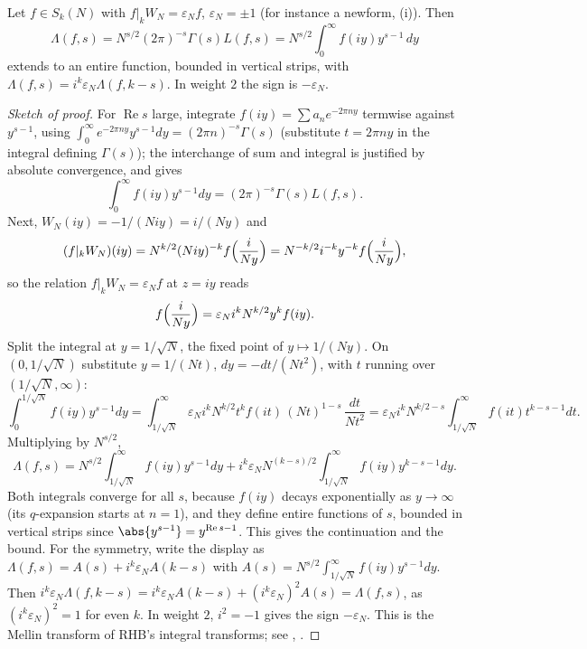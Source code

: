 \begin{theorem}\label{thm:hecke:functional-equation}
Let $f\in S_k(N)$ with $f|_kW_N=\varepsilon_Nf$, $\varepsilon_N=\pm1$ (for instance a newform, (i)). Then
\[
\Lambda(f,s)=N^{s/2}(2\pi)^{-s}\Gamma(s)L(f,s)=N^{s/2}\int_0^\infty f(iy)y^{s-1}\,dy
\]
extends to an entire function, bounded in vertical strips, with $\Lambda(f,s)=i^k\varepsilon_N\Lambda(f,k-s)$. In weight $2$ the sign is $-\varepsilon_N$.
\end{theorem}

\begin{proof}[Sketch of proof]
For $\operatorname{Re}s$ large, integrate $f(iy)=\sum a_ne^{-2\pi ny}$ termwise against $y^{s-1}$, using $\int_0^\infty e^{-2\pi ny}y^{s-1}dy=(2\pi n)^{-s}\Gamma(s)$ (substitute $t=2\pi ny$ in the
integral defining $\Gamma(s)$); the interchange of sum and integral is justified by absolute convergence, and gives
\[
\int_0^\infty f(iy)y^{s-1}dy=(2\pi)^{-s}\Gamma(s)L(f,s).
\]
Next, $W_N(iy)=-1/(Niy)=i/(Ny)$ and
\[
(f|_kW_N)(iy)=N^{k/2}(Niy)^{-k}f\Bigl(\frac i{Ny}\Bigr)=N^{-k/2}i^{-k}y^{-k}f\Bigl(\frac i{Ny}\Bigr),
\]
so the relation $f|_kW_N=\varepsilon_Nf$ at $z=iy$ reads
\[
f\Bigl(\frac{i}{Ny}\Bigr)=\varepsilon_Ni^kN^{k/2}y^kf(iy).
\]
Split the integral at $y=1/\sqrt N$, the fixed point of $y\mapsto1/(Ny)$. On $(0,1/\sqrt N)$ substitute $y=1/(Nt)$, $dy=-dt/(Nt^2)$, with $t$ running over $(1/\sqrt N,\infty)$:
\[
\int_0^{1/\sqrt N}f(iy)y^{s-1}dy=\int_{1/\sqrt N}^\infty\varepsilon_Ni^kN^{k/2}t^kf(it)\,(Nt)^{1-s}\,\frac{dt}{Nt^2}=\varepsilon_Ni^kN^{k/2-s}\int_{1/\sqrt N}^\infty f(it)t^{k-s-1}dt.
\]
Multiplying by $N^{s/2}$,
\[
\Lambda(f,s)=N^{s/2}\int_{1/\sqrt N}^\infty f(iy)y^{s-1}dy+i^k\varepsilon_NN^{(k-s)/2}\int_{1/\sqrt N}^\infty f(iy)y^{k-s-1}dy.
\]
Both integrals converge for all $s$, because $f(iy)$ decays exponentially as $y\to\infty$ (its $q$-expansion starts at $n=1$), and they define entire functions of $s$, bounded in vertical
strips since $\abs{y^{s-1}}=y^{\operatorname{Re}s-1}$. This gives the continuation and the bound. For the symmetry, write the display as $\Lambda(f,s)=A(s)+i^k\varepsilon_NA(k-s)$ with
$A(s)=N^{s/2}\int_{1/\sqrt N}^\infty f(iy)y^{s-1}dy$. Then $i^k\varepsilon_N\Lambda(f,k-s)=i^k\varepsilon_NA(k-s)+(i^k\varepsilon_N)^2A(s)=\Lambda(f,s)$, as $(i^k\varepsilon_N)^2=1$ for even $k$. In
weight $2$, $i^2=-1$ gives the sign $-\varepsilon_N$. This is the Mellin transform of RHB's integral transforms; see
\cite[Section 5.10]{DiamondShurman}, \cite[Section 4.3]{Miyake}.
\end{proof}

